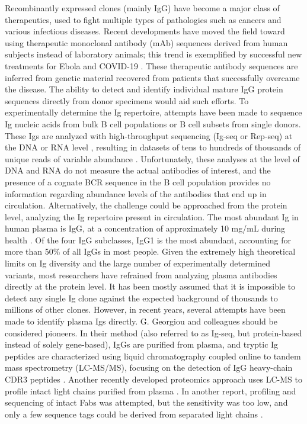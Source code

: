 Recombinantly expressed clones (mainly IgG) have become a major class of therapeutics, used to fight multiple types of pathologies such as cancers and various infectious diseases. Recent developments have moved the field toward using therapeutic monoclonal antibody (mAb) sequences derived from human subjects instead of laboratory animals; this trend is exemplified by successful new treatments for Ebola \cite{corti2016protective, dyer2019two, mulangu2019randomized} and COVID-19 \cite{jones2021neutralizing}. These therapeutic antibody sequences are inferred from genetic material recovered from patients that successfully overcame the disease. The ability to detect and identify individual mature IgG protein sequences directly from donor specimens would aid such efforts.
To experimentally determine the Ig repertoire, attempts have been made to sequence Ig nucleic acids from bulk B cell populations or B cell subsets from single donors. These Igs are analyzed with high-throughput sequencing (Ig-seq or Rep-seq) at the DNA or RNA level \cite{georgiou2014promise}, resulting in datasets of tens to hundreds of thousands of unique reads of variable abundance \cite{vollmers2013genetic}. Unfortunately, these analyses at the level of DNA and RNA do not measure the actual antibodies of interest, and the presence of a cognate BCR sequence in the B cell population provides no information regarding abundance levels of the antibodies that end up in circulation.
Alternatively, the challenge could be approached from the protein level, analyzing the Ig repertoire present in circulation. The most abundant Ig in human plasma is IgG, at a concentration of approximately 10 mg/mL during health \cite{cassidy1975human, gonzalez-quintela2008serum}. Of the four IgG subclasses, IgG1 is the most abundant, accounting for more than 50\% of all IgGs \cite{giessen1975quantification} in most people. Given the extremely high theoretical limits on Ig diversity and the large number of experimentally determined variants, most researchers have refrained from analyzing plasma antibodies directly at the protein level. It has been mostly assumed that it is impossible to detect any single Ig clone against the expected background of thousands to millions of other clones.
However, in recent years, several attempts have been made to identify plasma Igs directly. G. Georgiou and colleagues should be considered pioneers. In their method (also referred to as Ig-seq, but protein-based instead of solely gene-based), IgGs are purified from plasma, and tryptic Ig peptides are characterized using liquid chromatography coupled online to tandem mass spectrometry (LC-MS/MS), focusing on the detection of IgG heavy-chain CDR3 peptides \cite{chen2017proteomic, lavinder2014identification, lee2016molecular-level, lee2019persistent, wine2013molecular}. Another recently developed proteomics approach uses LC-MS to profile intact light chains purified from plasma \cite{barnidge2014phenotyping, barnidge2014using, he2019classification, he2017analysis, mills2015detecting, sharpley2019novel}. In another report, profiling and sequencing of intact Fabs was attempted, but the sensitivity was too low, and only a few sequence tags could be derived from separated light chains \cite{wang2019top-down}.

